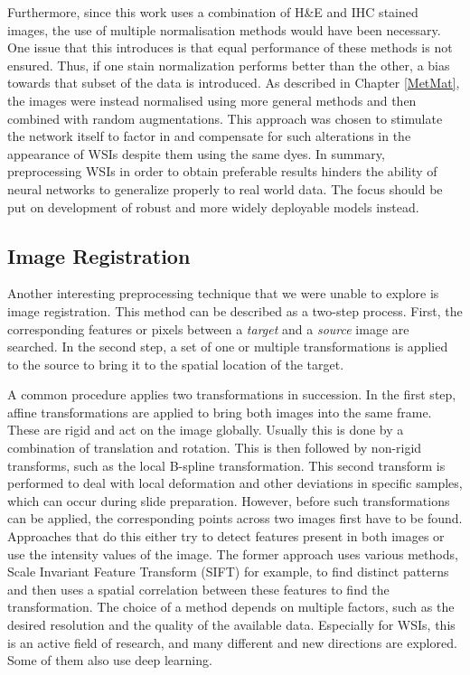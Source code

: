 Furthermore, since this work uses a combination of H\&E and IHC stained images, the use of multiple normalisation methods would have been necessary. One issue that this introduces is that equal performance of these methods is not ensured. Thus, if one stain normalization performs better than the other, a bias towards that subset of the data is introduced.
As described in Chapter \ref{MetMat}, the images were instead normalised using more general methods and then combined with random augmentations. This approach was chosen to stimulate the network itself to factor in and compensate for such alterations in the appearance of WSIs despite them using the same dyes. 
In summary, preprocessing WSIs in order to obtain preferable results hinders the ability of neural networks to generalize properly to real world data. The focus should be put on development of robust and more widely deployable models instead.

\subsection{Image Registration}
Another interesting preprocessing technique that we were unable to explore is image registration. This method can be described as a two-step process. First, the corresponding features or pixels between a \textit{target} and a \textit{source} image are searched. In the second step, a set of one or multiple transformations is applied to the source to bring it to the spatial location of the target.

A common procedure applies two transformations in succession. In the first step, affine transformations are applied to bring both images into the same frame. These are rigid and act on the image globally. Usually this is done by a combination of translation and rotation. This is then followed by non-rigid transforms, such as the local B-spline transformation. This second transform is performed to deal with local deformation and other deviations in specific samples, which can occur during slide preparation. \cite{Kondo2022Two}
However, before such transformations can be applied, the corresponding points across two images first have to be found. Approaches that do this either try to detect features present in both images or use the intensity values of the image. The former approach uses various methods,  Scale Invariant Feature Transform (SIFT) for example, to find distinct patterns and then uses a spatial correlation between these features to find the transformation.
The choice of a method depends on multiple factors, such as the desired resolution and the quality of the available data. \cite{Solorzano2019Whole}
Especially for WSIs, this is an active field of research, and many different and new directions are explored. Some of them also use deep learning. \cite{Solorzano2019Whole, Levy2020PathFlow, Chiaruttini2022Open, Hoque2022Whole, Kondo2022Two}

